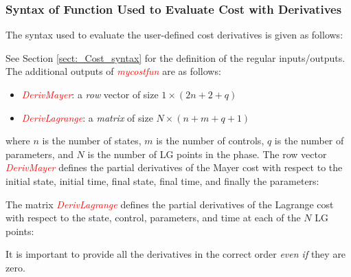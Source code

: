 \documentclass[10pt,final]{report}
\newcommand{\slred}[1]{\textcolor{red}{\sl #1}}
\begin{document}
\subsubsection{Syntax of Function Used to Evaluate Cost with Derivatives}

The syntax used to evaluate the user-defined cost derivatives is given as follows:
\begin{center}
\end{center}
See Section \ref{sect:_Cost_syntax} for the definition of the regular inputs/outputs.
The additional outputs of \slred{mycostfun} are as follows:
\begin{itemize}
  \item \slred{DerivMayer}: a {\em row} vector of size $1\times (2n+2+q)$
  \item \slred{DerivLagrange}: a {\em matrix} of size $N\times (n+m+q+1)$
\end{itemize}
where $n$ is the number of states, $m$ is the number of controls, $q$ is the number of parameters, and $N$ is the number of LG points in the phase. The row vector \slred{DerivMayer} defines the partial derivatives of the Mayer cost with respect to the initial state, initial time, final state, final time, and finally the parameters:
\begin{center}
\end{center}
The matrix \slred{DerivLagrange} defines the partial derivatives of the Lagrange cost with respect to the state, control, parameters, and time at each of the $N$ LG points:
\begin{center}
\end{center}
It is important to provide all the derivatives in the correct order {\em even if} they are zero.
\end{document}
